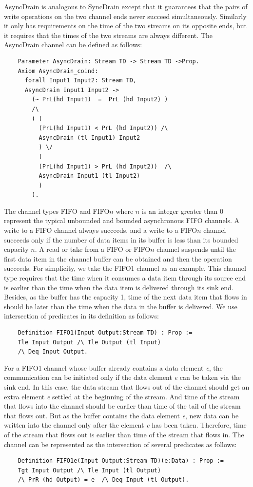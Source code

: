 \documentclass{llncs}
\begin{document}
AsyncDrain is analogous to SyncDrain except that it guarantees that the pairs of write operations on the two channel ends never succeed simultaneously. Similarly it only has requirements on the time of the two streams on its opposite ends, but it requires that the times of the two streams are always different. The AsyncDrain channel can be defined as follows:
\begin{verbatim}
    Parameter AsyncDrain: Stream TD -> Stream TD ->Prop.
    Axiom AsyncDrain_coind:
      forall Input1 Input2: Stream TD,
      AsyncDrain Input1 Input2 ->
        (~ PrL(hd Input1)  =  PrL (hd Input2) )
        /\
        ( (
          (PrL(hd Input1) < PrL (hd Input2)) /\
          AsyncDrain (tl Input1) Input2
          ) \/ 
          (
          (PrL(hd Input1) > PrL (hd Input2))  /\
          AsyncDrain Input1 (tl Input2)
          )  
        ).
\end{verbatim}

The channel types FIFO and FIFO$n$ where $n$ is an integer greater than $0$ represent the
typical unbounded and bounded asynchronous FIFO channels. A write to a FIFO channel always succeeds, and a write to a FIFO$n$ channel succeeds only if the
number of data items in its buffer is less than its bounded capacity $n$. A read or take from a FIFO or FIFO$n$ channel suspends until the first data item
in the channel buffer can be obtained and then the operation succeeds.
For simplicity, we take the FIFO1 channel as an example. This channel type requires that the time when it consumes a data item through its source end is earlier than the time when the data item is delivered through its sink end. Besides, as the buffer has the capacity 1, time of the next data item that flows in should be later than the time when the data in the buffer is delivered. We use intersection of predicates in its definition as follows:
\begin{verbatim}
    Definition FIFO1(Input Output:Stream TD) : Prop :=
    Tle Input Output /\ Tle Output (tl Input)
    /\ Deq Input Output.
\end{verbatim}

For a FIFO1 channel whose buffer already contains a data element \emph{e}, the communication can be initiated only if the data element \emph{e} can be taken via the sink end. In this case, the data stream that flows out of the channel should get an extra element \emph{e} settled at the beginning of the stream. And time of the stream that flows into the channel should be earlier than time of the tail of the stream that flows out. But as the buffer contains the data element \emph{e}, new data can be written into the channel only after the element \emph{e} has been taken. Therefore, time of the stream that flows out is earlier than time of the stream that flows in. The channel can be represented as the intersection of several predicates as follows:
\begin{verbatim}
    Definition FIFO1e(Input Output:Stream TD)(e:Data) : Prop :=
    Tgt Input Output /\ Tle Input (tl Output)
    /\ PrR (hd Output) = e  /\ Deq Input (tl Output).
\end{verbatim}
\end{document}
